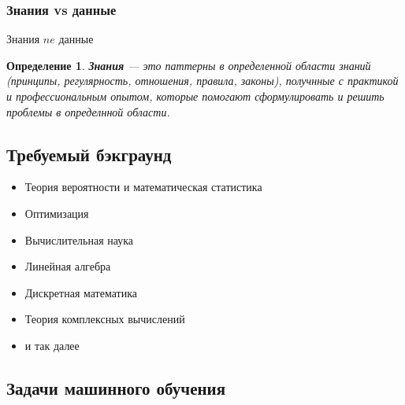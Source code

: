 \documentclass[10pt,a4paper,oneside,titlepage]{report}
\theoremstyle{defenition}
\newtheorem*{defenition}{Определение}
\theoremstyle{theorem}
\begin{document}
\subsubsection{Знания vs данные}

Знания $ne$ данные

\begin{defenition}
	{\bfseries Знания} --- это паттерны в определенной области знаний (принципы, регулярность, отношения, правила, законы), получнные с практикой и профессиональным опытом, которые помогают сформулировать и решить проблемы в определнной области.
\end{defenition}

\subsection{Требуемый бэкграунд}

\begin{itemize}
	\item Теория вероятности и математическая статистика
	\item Оптимизация
	\item Вычислительная наука
	\item Линейная алгебра
	\item Дискретная математика
	\item Теория комплексных вычислений
	\item и так далее
\end{itemize}

\subsection{Задачи машинного обучения}
\end{document}
